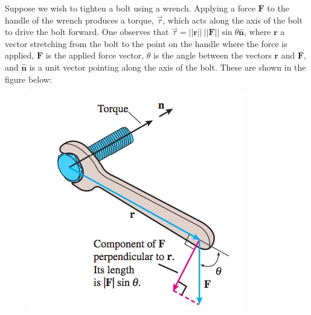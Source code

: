 \documentclass[12pt,letterpaper,reqno]{article}
\numberwithin{equation}{section}
\begin{document}
Suppose we wish to tighten a bolt using a wrench. Applying a force $\mathbf{F}$ to the handle of the wrench produces a torque, $\vec{\tau}$, which acts along the axis of the bolt to drive the bolt forward. One observes that $\vec{\tau}=||\mathbf{r}||\ ||\mathbf{F}||\sin \theta \mathbf{\hat{n}}$,
where $\mathbf{r}$ a vector stretching from the bolt to the point on the handle where the force is applied, $\mathbf{F}$ is the applied force vector, $\theta$ is the angle between the vectors $\mathbf{r}$ and $\mathbf{F}$, and $\mathbf{\hat{n}}$ is a unit vector pointing along the axis of the bolt. These are shown in the figure below:
\begin{figure}[h]
	\begin{center}
		\includegraphics[scale=0.5]{figures_mvc/torque_wrench}
	\end{center}
\end{figure}
\end{document}
